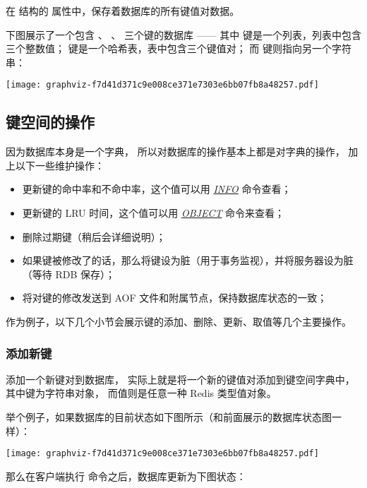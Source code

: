 \documentclass[a4paper,11pt,english]{sphinxmanual}
\begin{document}
在  结构的  属性中，保存着数据库的所有键值对数据。

下图展示了一个包含  、  、  三个键的数据库 ——
其中  键是一个列表，列表中包含三个整数值；
 键是一个哈希表，表中包含三个键值对；
而  键则指向另一个字符串：

\texttt{[image: graphviz-f7d41d371c9e008ce371e7303e6bb07fb8a48257.pdf]}


\subsection{键空间的操作}
\label{internal/db:id5}
因为数据库本身是一个字典，
所以对数据库的操作基本上都是对字典的操作，
加上以下一些维护操作：
\begin{itemize}
\item {} 
更新键的命中率和不命中率，这个值可以用 \href{http://redis.readthedocs.org/en/latest/server/info.html\#info}{\emph{INFO}} 命令查看；

\item {} 
更新键的 LRU 时间，这个值可以用 \href{http://redis.readthedocs.org/en/latest/key/object.html\#object}{\emph{OBJECT}} 命令来查看；

\item {} 
删除过期键（稍后会详细说明）；

\item {} 
如果键被修改了的话，那么将键设为脏（用于事务监视），并将服务器设为脏（等待 RDB 保存）；

\item {} 
将对键的修改发送到 AOF 文件和附属节点，保持数据库状态的一致；

\end{itemize}

作为例子，以下几个小节会展示键的添加、删除、更新、取值等几个主要操作。


\subsubsection{添加新键}
\label{internal/db:id6}
添加一个新键对到数据库，
实际上就是将一个新的键值对添加到键空间字典中，
其中键为字符串对象，
而值则是任意一种 Redis 类型值对象。

举个例子，如果数据库的目前状态如下图所示（和前面展示的数据库状态图一样）：

\texttt{[image: graphviz-f7d41d371c9e008ce371e7303e6bb07fb8a48257.pdf]}

那么在客户端执行  命令之后，数据库更新为下图状态：
\end{document}
